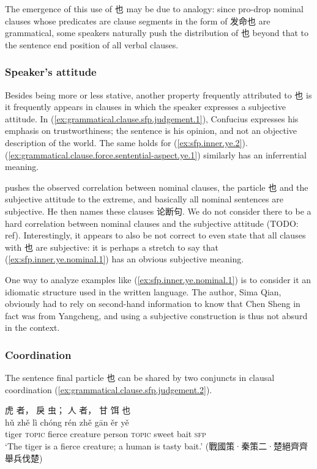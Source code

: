 \documentclass[UTF8, a4paper, oneside, scheme=plain, 12pt]{ctexrep}
\newcommand*{\citepages}[1]{pp.~{#1}}
\newcommand{\translate}[1]{`#1'}
\newcommand*{\category}[1]{\textsc{#1}}
\begin{document}
The emergence of this use of 也 may be due to analogy: 
since pro-drop nominal clauses whose predicates are clause segments in the form of 发命也 are grammatical,
some speakers naturally push the distribution of 也 beyond that to the sentence end position of all verbal clauses.

\subsubsection{Speaker's attitude}

Besides being more or less stative, another property frequently attributed to 也 is it frequently appears in clauses in which the speaker expresses a subjective attitude.
In (\ref{ex:grammatical.clause.sfp.judgement.1}),
Confucius expresses his emphasis on trustworthiness;
the sentence is his opinion, and not an objective description of the world.
The same holds for (\ref{ex:sfp.inner.ye.2}).
(\ref{ex:grammatical.clause.force.sentential-aspect.ye.1}) similarly has an inferrential meaning.

\citet[\citepages{54-55,58}]{li2004grammar} pushes the observed correlation between nominal clauses, the particle 也 and the subjective attitude to the extreme, 
and basically all nominal sentences are subjective. He then names these clauses 论断句.
We do not consider there to be a hard correlation between nominal clauses and the subjective attitude (TODO: ref).
Interestingly, it appears to also be not correct to even state that all clauses with 也 are subjective:
it is perhaps a stretch to say that (\ref{ex:sfp.inner.ye.nominal.1}) has an obvious subjective meaning.

One way to analyze examples like (\ref{ex:sfp.inner.ye.nominal.1}) 
is to consider it an idiomatic structure used in the written language.
The author, Sima Qian, obviously had to rely on second-hand information to know that Chen Sheng in fact was from Yangcheng,
and using a subjective construction is thus not absurd in the context.

\subsubsection{Coordination}

The sentence final particle 也 can be shared by two conjuncts in clausal coordination
(\ref{ex:grammatical.clause.sfp.judgement.2}).

\begin{exe}
    \ex\label{ex:grammatical.clause.sfp.judgement.2}
    \glll 虎 者， 戾 虫； 人 者， 甘 饵 也 \\
    hǔ zhě lì chóng rén zhě gān ěr yě \\
    tiger \category{topic} fierce creature person \category{topic} sweet bait \category{sfp} \\
    \glt\translate{The tiger is a fierce creature; a human is tasty bait.} \hfill (戰國策·秦策二·楚絕齊齊舉兵伐楚)
\end{exe}
\end{document}
